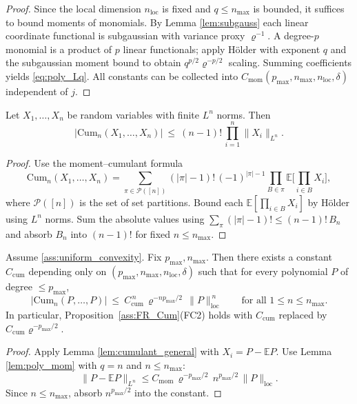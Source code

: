 \begin{proof}
Since the local dimension $n_{\mathrm{loc}}$ is fixed and $q\le n_{\max}$ is bounded, it suffices to bound moments of monomials.
By Lemma \ref{lem:subgauss} each linear coordinate functional is subgaussian with variance proxy $\varrho^{-1}$.
A degree-$p$ monomial is a product of $p$ linear functionals; apply H\"older with exponent $q$ and the subgaussian moment bound
to obtain $q^{p/2}\varrho^{-p/2}$ scaling. Summing coefficients yields \eqref{eq:poly_Lq}.
All constants can be collected into $C_{\mathrm{mom}}(p_{\max},n_{\max},n_{\mathrm{loc}},\delta)$ independent of $j$.
\end{proof}

\begin{lemma}\label{lem:cumulant_general}
Let $X_1,\dots,X_n$ be random variables with finite $L^n$ norms. Then
\[
|\mathrm{Cum}_n(X_1,\dots,X_n)|\ \le\ (n-1)!\,\prod_{i=1}^n \|X_i\|_{L^n}.
\]
\end{lemma}

\begin{proof}
Use the moment--cumulant formula
\[
\mathrm{Cum}_n(X_1,\dots,X_n)=\sum_{\pi\in\mathcal P([n])} (|\pi|-1)!\,(-1)^{|\pi|-1}\prod_{B\in\pi}\mathbb E\Big[\prod_{i\in B}X_i\Big],
\]
where $\mathcal P([n])$ is the set of set partitions.
Bound each $\mathbb E[\prod_{i\in B}X_i]$ by H\"older using $L^n$ norms.
Sum the absolute values using $\sum_{\pi} (|\pi|-1)!\le (n-1)!\,B_n$ and absorb $B_n$ into $(n-1)!$ for fixed $n\le n_{\max}$.
\end{proof}

\begin{theorem}\label{thm:poly_cumulant}
Assume \ref{ass:uniform_convexity}. Fix $p_{\max},n_{\max}$.
Then there exists a constant $C_{\mathrm{cum}}$ depending only on $(p_{\max},n_{\max},n_{\mathrm{loc}},\delta)$ such that for every polynomial $P$ of degree $\le p_{\max}$,
\[
|\mathrm{Cum}_n(P,\dots,P)|\ \le\ C_{\mathrm{cum}}^{\,n}\,\varrho^{-n p_{\max}/2}\,\|P\|_{\mathrm{loc}}^{\,n}
\qquad\text{for all }1\le n\le n_{\max}.
\]
In particular, Proposition~\ref{ass:FR_Cum}(FC2) holds with $C_{\mathrm{cum}}$ replaced by $C_{\mathrm{cum}}\varrho^{-p_{\max}/2}$.
\end{theorem}

\begin{proof}
Apply Lemma \ref{lem:cumulant_general} with $X_i=P-\mathbb EP$.
Use Lemma \ref{lem:poly_mom} with $q=n$ and $n\le n_{\max}$:
\[
\|P-\mathbb EP\|_{L^n}\le C_{\mathrm{mom}}\,\varrho^{-p_{\max}/2}\,n^{p_{\max}/2}\,\|P\|_{\mathrm{loc}}.
\]
Since $n\le n_{\max}$, absorb $n^{p_{\max}/2}$ into the constant.
\end{proof}

